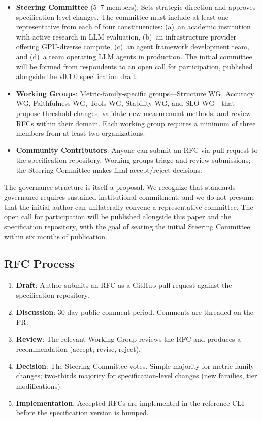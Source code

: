 \documentclass[11pt]{article}
\begin{document}
\begin{itemize}[leftmargin=12pt]
  \item \textbf{Steering Committee} (5--7 members): Sets strategic direction and approves specification-level changes. The committee must include at least one representative from each of four constituencies: (a)~an academic institution with active research in LLM evaluation, (b)~an infrastructure provider offering GPU-diverse compute, (c)~an agent framework development team, and (d)~a team operating LLM agents in production. The initial committee will be formed from respondents to an open call for participation, published alongside the v0.1.0 specification draft.

  \item \textbf{Working Groups}: Metric-family-specific groups---Structure WG, Accuracy WG, Faithfulness WG, Tools WG, Stability WG, and SLO WG---that propose threshold changes, validate new measurement methods, and review RFCs within their domain. Each working group requires a minimum of three members from at least two organizations.

  \item \textbf{Community Contributors}: Anyone can submit an RFC via pull request to the specification repository. Working groups triage and review submissions; the Steering Committee makes final accept/reject decisions.
\end{itemize}

The governance structure is itself a proposal. We recognize that standards governance requires sustained institutional commitment, and we do not presume that the initial author can unilaterally convene a representative committee. The open call for participation will be published alongside this paper and the specification repository, with the goal of seating the initial Steering Committee within six months of publication.

\subsection{RFC Process}

\begin{enumerate}[leftmargin=16pt]
  \item \textbf{Draft}: Author submits an RFC as a GitHub pull request against the specification repository.
  \item \textbf{Discussion}: 30-day public comment period. Comments are threaded on the PR.
  \item \textbf{Review}: The relevant Working Group reviews the RFC and produces a recommendation (accept, revise, reject).
  \item \textbf{Decision}: The Steering Committee votes. Simple majority for metric-family changes; two-thirds majority for specification-level changes (new families, tier modifications).
  \item \textbf{Implementation}: Accepted RFCs are implemented in the reference CLI before the specification version is bumped.
\end{enumerate}
\end{document}
